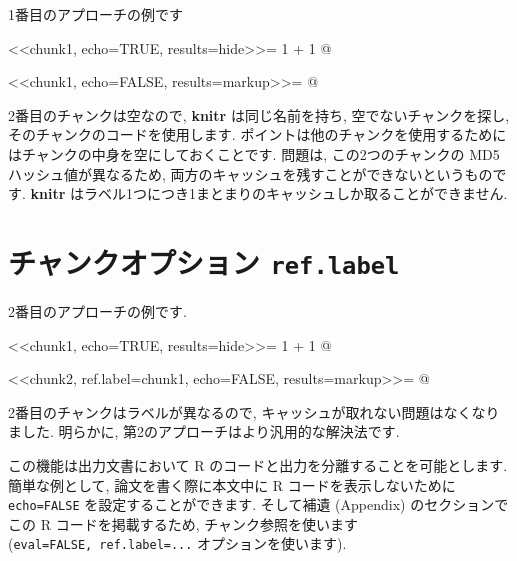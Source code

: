 \documentclass[
  xelatex,ja=standard,jafont=noto]{bxjsreport}
\newenvironment{Shaded}{\begin{snugshade}}{\end{snugshade}}
\newcommand{\NormalTok}[1]{#1}
\begin{document}
1番目のアプローチの例です

\begin{Shaded}
\begin{Highlighting}[]
\NormalTok{\textless{}\textless{}chunk1, echo=TRUE, results=\textquotesingle{}hide\textquotesingle{}\textgreater{}\textgreater{}=}
\NormalTok{1 + 1}
\NormalTok{@}

\NormalTok{\textless{}\textless{}chunk1, echo=FALSE, results=\textquotesingle{}markup\textquotesingle{}\textgreater{}\textgreater{}=}
\NormalTok{@}
\end{Highlighting}
\end{Shaded}

2番目のチャンクは空なので, \textbf{knitr} は同じ名前を持ち,
空でないチャンクを探し, そのチャンクのコードを使用します.
ポイントは他のチャンクを使用するためにはチャンクの中身を空にしておくことです.
問題は, この2つのチャンクの MD5 ハッシュ値が異なるため,
両方のキャッシュを残すことができないというものです. \textbf{knitr}
はラベル1つにつき1まとまりのキャッシュしか取ることができません.

\hypertarget{ux30c1ux30e3ux30f3ux30afux30aaux30d7ux30b7ux30e7ux30f3-ref.label}{%
\section*{\texorpdfstring{チャンクオプション
\texttt{ref.label}}{チャンクオプション ref.label}}\label{ux30c1ux30e3ux30f3ux30afux30aaux30d7ux30b7ux30e7ux30f3-ref.label}}

2番目のアプローチの例です.

\begin{Shaded}
\begin{Highlighting}[]
\NormalTok{\textless{}\textless{}chunk1, echo=TRUE, results=\textquotesingle{}hide\textquotesingle{}\textgreater{}\textgreater{}=}
\NormalTok{1 + 1}
\NormalTok{@}

\NormalTok{\textless{}\textless{}chunk2, ref.label=\textquotesingle{}chunk1\textquotesingle{}, echo=FALSE, results=\textquotesingle{}markup\textquotesingle{}\textgreater{}\textgreater{}=}
\NormalTok{@}
\end{Highlighting}
\end{Shaded}

2番目のチャンクはラベルが異なるので,
キャッシュが取れない問題はなくなりました. 明らかに,
第2のアプローチはより汎用的な解決法です.

この機能は出力文書において R のコードと出力を分離することを可能とします.
簡単な例として, 論文を書く際に本文中に R コードを表示しないために
\texttt{echo=FALSE} を設定することができます. そして補遺 (Appendix)
のセクションでこの R コードを掲載するため, チャンク参照を使います
(\texttt{eval=FALSE,\ ref.label=...} オプションを使います).
\end{document}
